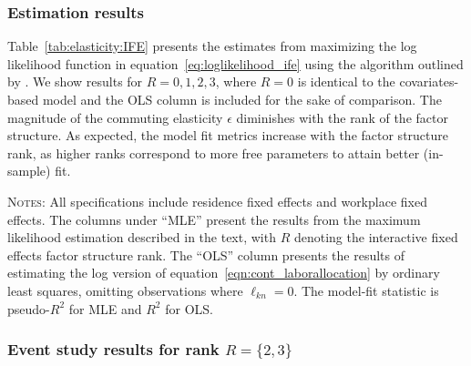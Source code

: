 \documentclass[11pt]{article}
\theoremstyle{definition}
\begin{document}
\subsubsection{Estimation results}

Table~\ref{tab:elasticity:IFE} presents the estimates from
maximizing the log likelihood function in equation~\eqref{eq:loglikelihood_ife} using the algorithm outlined by .
We show results for \(R = 0, 1, 2, 3\), where \(R = 0\) is identical to the covariates-based model and the OLS column is included for the sake of comparison.
The magnitude of the commuting elasticity $\epsilon$ diminishes with the rank of the factor structure.
As expected, the model fit metrics increase with the factor structure rank, as higher ranks correspond to more free parameters to attain better (in-sample) fit.

\begin{table}[hbt]
\caption{Commuting elasticity estimates from IFE specification}
\label{tab:elasticity:IFE}
\begin{center}
\vspace{-5mm}

\begin{minipage}{0.95\textwidth}
{\footnotesize \textsc{Notes}: 
All specifications include residence fixed effects and workplace fixed effects.
The columns under  ``MLE''  present the results from the maximum likelihood estimation described in the text, with \(R\) denoting the interactive fixed effects factor structure rank.
The ``OLS'' column presents the results of estimating the log version of equation~\eqref{eqn:cont_laborallocation} by ordinary least squares, omitting observations where $\ell_{kn}=0$.
The model-fit statistic is pseudo-$R^2$ for MLE and $R^2$ for OLS.}
\end{minipage}
\end{center}
\vspace{-1.5em}
\end{table}

\subsubsection{Event study results for rank $R=\{2,3\}$}
\end{document}
